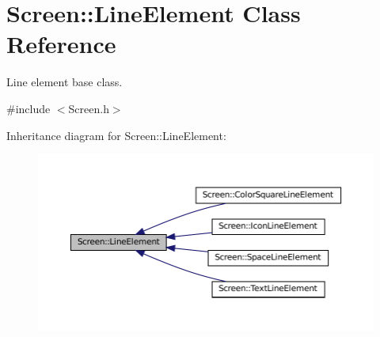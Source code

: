 \hypertarget{classScreen_1_1LineElement}{}\section{Screen\+:\+:Line\+Element Class Reference}
\label{classScreen_1_1LineElement}


Line element base class.  




{\ttfamily \#include $<$Screen.\+h$>$}



Inheritance diagram for Screen\+:\+:Line\+Element\+:
\nopagebreak
\begin{figure}[H]
\begin{center}
\leavevmode
\includegraphics[width=350pt]{classScreen_1_1LineElement__inherit__graph}
\end{center}
\end{figure}
